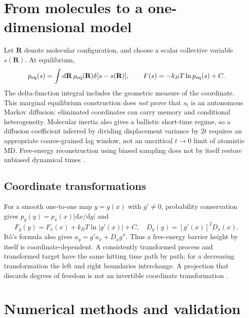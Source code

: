 \documentclass[11pt,a4paper]{article}
\newcommand{\dd}{\mathrm d}
\theoremstyle{remark}\newtheorem*{remark}{Physical interpretation}
\begin{document}
\section{From molecules to a one-dimensional model}
Let $\mathbf R$ denote molecular configuration, and choose a scalar collective variable $s(\mathbf R)$. At equilibrium,
\begin{equation}p_{\rm eq}(s)=\int\dd\mathbf R\,\rho_{\rm eq}(\mathbf R)\delta[s-s(\mathbf R)],\qquad F(s)=-k_BT\ln p_{\rm eq}(s)+C.\end{equation}
The delta-function integral includes the geometric measure of the coordinate. This marginal equilibrium construction does \emph{not} prove that $s_t$ is an autonomous Markov diffusion: eliminated coordinates can carry memory and conditional heterogeneity. Molecular inertia also gives a ballistic short-time regime, so a diffusion coefficient inferred by dividing displacement variance by $2t$ requires an appropriate coarse-grained lag window, not an uncritical $t\to0$ limit of atomistic MD. Free-energy reconstruction using biased sampling does not by itself restore unbiased dynamical times \cite{hummer2005,besthummer}.

\subsection{Coordinate transformations}
For a smooth one-to-one map $y=g(x)$ with $g'\ne0$, probability conservation gives $p_y(y)=p_x(x)|\dd x/\dd y|$ and
\begin{equation}F_y(y)=F_x(x)+k_BT\ln|g'(x)|+C,\quad D_y(y)=[g'(x)]^2D_x(x).\end{equation}
It\^o's formula also gives $a_y=g'a_x+D_xg''$. Thus a free-energy barrier height by itself is coordinate-dependent. A consistently transformed process and transformed target have the same hitting time path by path; for a decreasing transformation the left and right boundaries interchange. A projection that discards degrees of freedom is not an invertible coordinate transformation \cite{besthummer}.

\section{Numerical methods and validation}
\end{document}
